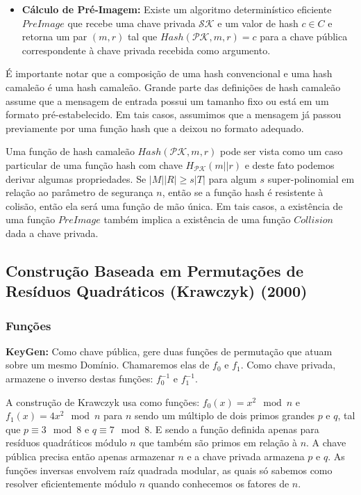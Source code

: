 \documentclass[a4paper]{article}
\begin{document}
\begin{itemize}
\item\textbf{Cálculo de Pré-Imagem:} Existe um algoritmo
  determinístico eficiente $PreImage$ que recebe uma chave privada
  $\mathcal{SK}$ e um valor de hash $c \in C$ e retorna um par $(m,
  r)$ tal que $Hash(\mathcal{PK}, m, r) = c$ para a chave pública
  correspondente à chave privada recebida como argumento.
\end{itemize}
  
É importante notar que a composição de uma hash convencional e uma
hash camaleão é uma hash camaleão. Grande parte das definições de hash
camaleão assume que a mensagem de entrada possui um tamanho fixo ou
está em um formato pré-estabelecido. Em tais casos, assumimos que a
mensagem já passou previamente por uma função hash que a deixou no
formato adequado.

Uma função de hash camaleão $Hash(\mathcal{PK}, m, r)$ pode ser vista
como um caso particular de uma função hash com chave
$H_{\mathcal{PK}}(m||r)$ e deste fato podemos derivar algumas
propriedades. Se $|M||R| \geq s |T|$ para algum $s$ super-polinomial
em relação ao parâmetro de segurança $n$, então se a função hash é
resistente à colisão, então ela será uma função de mão única. Em tais
casos, a existência de uma função $PreImage$ também implica a
existência de uma função $Collision$ dada a chave privada.

\subsection{Construção Baseada em Permutações de Resíduos Qua\-drá\-ti\-cos
  (Krawczyk) (2000) \cite{krawczyk}}

\subsubsection{Funções}

\textbf{KeyGen: }Como chave pública, gere duas funções de permutação
que atuam sobre um mesmo Domínio. Chamaremos elas de $f_0$ e
$f_1$. Como chave privada, armazene o inverso destas funções:
$f_0^{-1}$ e $f_1^{-1}$.

A construção de Krawczyk usa como funções: $f_0(x) = x^2 \mod n$ e
$f_1(x) = 4x^2 \mod n$ para $n$ sendo um múltiplo de dois primos
grandes $p$ e $q$, tal que $p \equiv 3 \mod 8$ e $q \equiv 7 \mod
8$. E sendo a função definida apenas para resíduos quadráticos módulo
$n$ que também são primos em relação à $n$. A chave pública precisa
então apenas armazenar $n$ e a chave privada armazena $p$ e $q$. As
funções inversas envolvem raíz quadrada modular, as quais só sabemos
como resolver eficientemente módulo $n$ quando conhecemos os fatores
de $n$.
\end{document}

